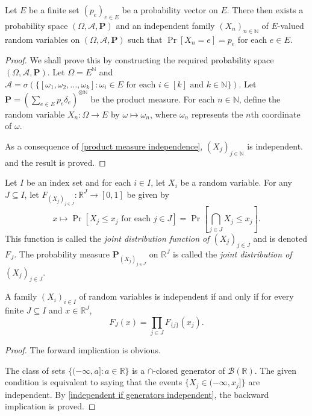 \begin{theorem}
    Let $E$ be a finite set $(p_e)_{e\in E}$ be a probability vector on $E$. There then exists a probability space $(\Omega,\mathcal{A},\textbf{P})$ and an independent family $(X_n)_{n\in\mathbb{N}}$ of $E$-valued random variables on $(\Omega,\mathcal{A},\textbf{P})$ such that $\Pr[X_n = e] = p_e$ for each $e\in E$.
\end{theorem}
\begin{proof}
    We shall prove this by constructing the required probability space $(\Omega,\mathcal{A},\textbf{P})$. Let $\Omega=E^\mathbb{N}$ and $\mathcal{A}=\sigma\left(\{[\omega_1,\omega_2,\ldots,\omega_k]:\omega_i\in E\text{ for each }i\in[k]\text{ and }k\in\mathbb{N}\}\right)$. Let $\textbf{P}=\left(\sum_{e\in E}p_e\delta_e\right)^{\otimes\mathbb{N}}$ be the product measure. For each $n\in\mathbb{N}$, define the random variable $X_n:\Omega\to E$ by $\omega\mapsto \omega_n$, where $\omega_n$ represents the $n$th coordinate of $\omega$.
    
    As a consequence of \cref{product measure independence}, $(X_j)_{j\in\mathbb{N}}$ is independent. and the result is proved.
\end{proof}

\begin{definition}
    Let $I$ be an index set and for each $i\in I$, let $X_i$ be a random variable. For any $J\subseteq I$, let $F_{(X_j)_{j\in J}}:\mathbb{R}^J\to[0,1]$ be given by
    $$x\mapsto \Pr[X_j\leq x_j\text{ for each }j\in J]=\Pr\left[\bigcap_{j\in J} X_j\leq x_j\right].$$
    This function is called the \textit{joint distribution function of $(X_j)_{j\in J}$} and is denoted $F_J$. The probability measure $\textbf{P}_{(X_j)_{j\in J}}$ on $\mathbb{R}^J$ is called the \textit{joint distribution of $(X_j)_{j\in J}$}.
\end{definition}

\begin{theorem}
    A family $(X_i)_{i\in I}$ of random variables is independent if and only if for every finite $J\subseteq I$ and $x\in\mathbb{R}^J$,
    $$F_J(x) = \prod_{j\in J}F_{\{j\}}(x_j).$$
\end{theorem}
\begin{proof}
    The forward implication is obvious.
    
    The class of sets $\{(-\infty,a]:a\in\mathbb{R}\}$ is a $\cap$-closed generator of $\mathcal{B}(\mathbb{R})$. The given condition is equivalent to saying that the events $\{X_j\in(-\infty,x_j]\}$ are independent. By \cref{independent if generators independent}, the backward implication is proved.
\end{proof}

